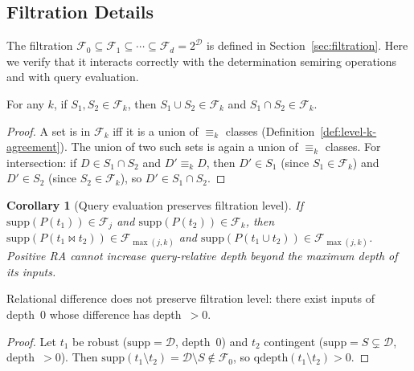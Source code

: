 \documentclass[acmsmall,review,anonymous]{acmart}
\newtheorem{corollary}{Corollary}
\theoremstyle{remark}
\numberwithin{definition}{section}
\numberwithin{theorem}{section}
\numberwithin{lemma}{section}
\numberwithin{corollary}{section}
\numberwithin{remark}{section}
\numberwithin{example}{section}
\numberwithin{observation}{section}
\numberwithin{assumption}{section}
\begin{document}
\subsection{Filtration Details}

The filtration $\mathcal{F}_0 \subseteq \mathcal{F}_1 \subseteq \cdots
\subseteq \mathcal{F}_d = 2^{\mathcal{D}}$ is defined in
Section~\ref{sec:filtration}.
Here we verify that it interacts correctly with the determination
semiring operations and with query evaluation.

\begin{proposition}
  For any $k$, if $S_1, S_2 \in \mathcal{F}_k$, then
  $S_1 \cup S_2 \in \mathcal{F}_k$ and
  $S_1 \cap S_2 \in \mathcal{F}_k$.
\end{proposition}
\begin{proof}
  A set is in $\mathcal{F}_k$ iff it is a union of $\equiv_k$ classes
  (Definition~\ref{def:level-k-agreement}).
  The union of two such sets is again a union of $\equiv_k$ classes.
  For intersection: if $D \in S_1 \cap S_2$ and $D' \equiv_k D$,
  then $D' \in S_1$ (since $S_1 \in \mathcal{F}_k$) and
  $D' \in S_2$ (since $S_2 \in \mathcal{F}_k$), so
  $D' \in S_1 \cap S_2$.
\end{proof}

\begin{corollary}[Query evaluation preserves filtration level]
  If $\mathrm{supp}(P(t_1)) \in \mathcal{F}_j$ and
  $\mathrm{supp}(P(t_2)) \in \mathcal{F}_k$, then
  $\mathrm{supp}(P(t_1 \bowtie t_2)) \in \mathcal{F}_{\max(j,k)}$ and
  $\mathrm{supp}(P(t_1 \cup t_2)) \in \mathcal{F}_{\max(j,k)}$.
  Positive RA cannot increase query-relative depth beyond the
  maximum depth of its inputs.
\end{corollary}

\begin{proposition}
  \label{prop:difference-increases-depth}
  Relational difference does not preserve filtration level: there exist
  inputs of depth~$0$ whose difference has depth~$> 0$.
\end{proposition}
\begin{proof}
  Let $t_1$ be robust ($\mathrm{supp} = \mathcal{D}$, depth~$0$) and
  $t_2$ contingent ($\mathrm{supp} = S \subsetneq \mathcal{D}$,
  depth~$> 0$).
  Then $\mathrm{supp}(t_1 \setminus t_2) = \mathcal{D} \setminus S
  \notin \mathcal{F}_0$, so $\mathrm{qdepth}(t_1 \setminus t_2) > 0$.
\end{proof}
\end{document}
